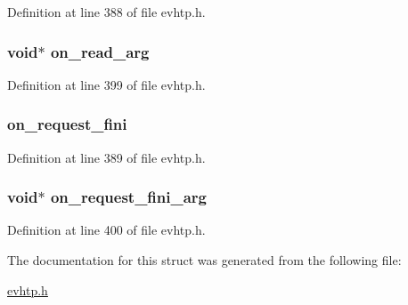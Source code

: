 Definition at line 388 of file evhtp.h.

\hypertarget{structevhtp__hooks__s_af1ca4346719c7e3b841867e153bc7504}{
\subsubsection[{on\_\-read\_\-arg}]{\setlength{\rightskip}{0pt plus 5cm}void$\ast$ {\bf on\_\-read\_\-arg}}}
\label{structevhtp__hooks__s_af1ca4346719c7e3b841867e153bc7504}


Definition at line 399 of file evhtp.h.

\hypertarget{structevhtp__hooks__s_a6ac6a986b72cd6ddb313d5473b24a775}{
\subsubsection[{on\_\-request\_\-fini}]{ {\bf on\_\-request\_\-fini}}}
\label{structevhtp__hooks__s_a6ac6a986b72cd6ddb313d5473b24a775}


Definition at line 389 of file evhtp.h.

\hypertarget{structevhtp__hooks__s_a6ff6528fe6d2018c55a718ca829e00be}{
\subsubsection[{on\_\-request\_\-fini\_\-arg}]{\setlength{\rightskip}{0pt plus 5cm}void$\ast$ {\bf on\_\-request\_\-fini\_\-arg}}}
\label{structevhtp__hooks__s_a6ff6528fe6d2018c55a718ca829e00be}


Definition at line 400 of file evhtp.h.



The documentation for this struct was generated from the following file:\begin{DoxyCompactItemize}
\item 
\hyperlink{evhtp_8h}{evhtp.h}\end{DoxyCompactItemize}
